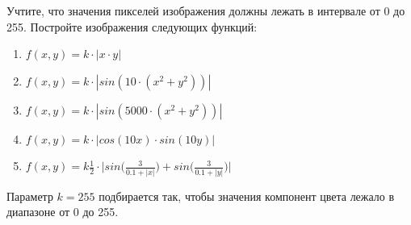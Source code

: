 \documentclass{article}
\begin{document}
\begin{itemize}
Учтите, что значения пикселей изображения должны лежать в интервале от 0 до 255. Постройте изображения следующих функций: 
\begin{enumerate}
\item $f(x, y) = k\cdot|x \cdot y|$
\item $f(x, y) = k\cdot|sin(10\cdot(x^2 + y^2))|$
\item $f(x, y) = k\cdot|sin(5000\cdot(x^2 + y^2))|$
\item $f(x, y) = k\cdot|cos(10x)\cdot sin(10y)|$
\item $f(x, y) = k\frac{1}{2}\cdot\Big|sin\Big(\frac{3}{0.1 + |x|}\Big) + sin\Big(\frac{3}{0.1 + |y|}\Big)\Big|$
\end{enumerate}
Параметр $k = 255$ подбирается так, чтобы значения компонент цвета лежало в диапазоне от 0 до 255.
\end{itemize}
\newpage
\end{document}
